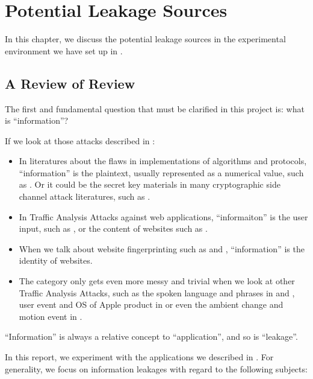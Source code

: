 \chapter{Potential Leakage Sources}

In this chapter, we discuss the potential leakage sources in the experimental environment we have set up in . 

\section{A Review of Review}

The first and fundamental question that must be clarified in this project is: what is ``information''?

If we look at those attacks described in :

\begin{itemize}
	\item In literatures about the flaws in implementations of algorithms and protocols, ``information'' is the plaintext, usually represented as a numerical value, such as \cite{802154sec} \cite{rfc7457} \cite{CompressionRatioAttack} \cite{PaddingOracle}. Or it could be the secret key materials in many cryptographic side channel attack literatures, such as \cite{DPA}.
	\item In Traffic Analysis Attacks against web applications, ``informaiton'' is the user input, such as \cite{PinpointWeb} \cite{SearchAttack}, or the content of websites such as \cite{WebSideChannel}.
	\item When we talk about website fingerprinting such as \cite{WebsiteFingerprint} \cite{Peekaboo} and \cite{PClassifier}, ``information'' is the identity of websites. 
	\item The category only gets even more messy and trivial when we look at other Traffic Analysis Attacks, such as the spoken language and phrases in \cite{VoIPLanguage} and \cite{VoIPPhrases}, user event and OS of Apple product in \cite{AppleMessage} or even the ambient change and motion event in \cite{Video}.
\end{itemize}

``Information'' is always a relative concept to ``application'', and so is ``leakage''. 

In this report, we experiment with the applications we described in . For generality, we focus on information leakages with regard to the following subjects:

